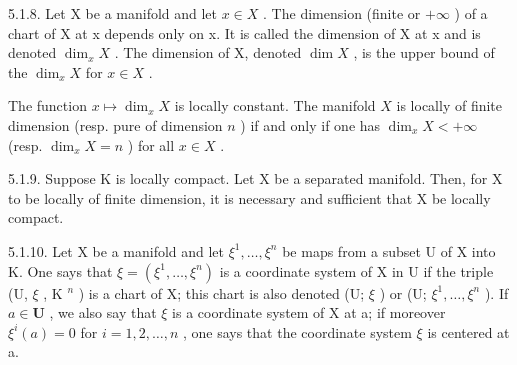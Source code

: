 5.1.8. Let X be a manifold and let \(x \in X\) . The dimension (finite or \(+\infty\) ) of a chart of X at x depends only on x. It is called the dimension of X at x and is denoted \(\dim_{x}X\) . The dimension of X, denoted \(\dim X\) , is the upper bound of the \(\dim_{x}X\) for \(x \in X\) .

The function \(x \mapsto \dim_x X\) is locally constant. The manifold \(X\) is locally of finite dimension (resp. pure of dimension \(n\) ) if and only if one has \(\dim_x X < +\infty\) (resp. \(\dim_x X = n\) ) for all \(x \in X\) .

5.1.9. Suppose K is locally compact. Let X be a separated manifold. Then, for X to be locally of finite dimension, it is necessary and sufficient that X be locally compact.

5.1.10. Let X be a manifold and let \(\xi^{1},\ldots,\xi^{n}\) be maps from a subset U of X into K. One says that \(\xi=(\xi^{1},\ldots,\xi^{n})\) is a coordinate system of X in U if the triple (U, \(\xi\) , K \(^{n}\) ) is a chart of X; this chart is also denoted (U; \(\xi\) ) or (U; \(\xi^{1},\ldots,\xi^{n}\) ). If \(a\in\mathbf{U}\) , we also say that \(\xi\) is a coordinate system of X at a; if moreover \(\xi^{i}(a)=0\) for \(i=1,2,\ldots,n\) , one says that the coordinate system \(\xi\) is centered at a.

